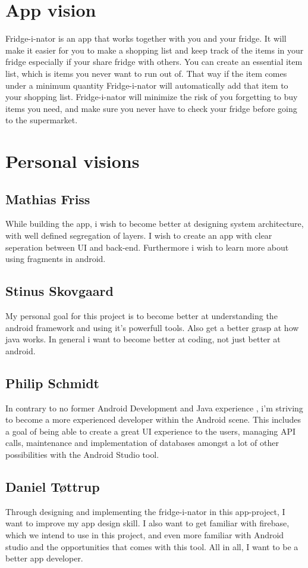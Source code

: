 \documentclass[12pt]{article}
\begin{document}
\section{App vision}
Fridge-i-nator is an app that works together with you and your fridge. It will make it easier for you to make a shopping
list and keep track of the items in your fridge especially if your share fridge with others. You can create an essential
item list, which is items you never want to run out of. That way if the item comes under a minimum quantity Fridge-i-nator
will automatically add that item to your shopping list. 
Fridge-i-nator will minimize the risk of you forgetting to buy items you need, and make sure you never have to check your
fridge before going to the supermarket.

\section{Personal visions}

\subsection{Mathias Friss}
While building the app, i wish to become better at designing system architecture, with well defined segregation of layers. I wish to create an app with clear seperation between UI and back-end.
Furthermore i wish to learn more about using fragments in android.

\subsection{Stinus Skovgaard}
My personal goal for this project is to become better at understanding the android framework and using it's powerfull tools. Also get a better grasp at how java works. In general i want to become better at coding, not just better at android.

\subsection{Philip Schmidt}
In contrary to no former Android Development and Java experience , i'm striving to become a more experienced developer within the Android scene.
This includes a goal of being able to create a great UI experience to the users, managing API calls, maintenance and implementation of databases amongst a lot of other possibilities with the Android Studio tool.
\subsection{Daniel Tøttrup}
Through designing and implementing the fridge-i-nator in this app-project, I want to improve my app design skill. I also want to get familiar
with firebase, which we intend to use in this project, and even more familiar with
Android studio and the opportunities that comes with this tool. All in all, I want to be a better app developer.
\end{document}
